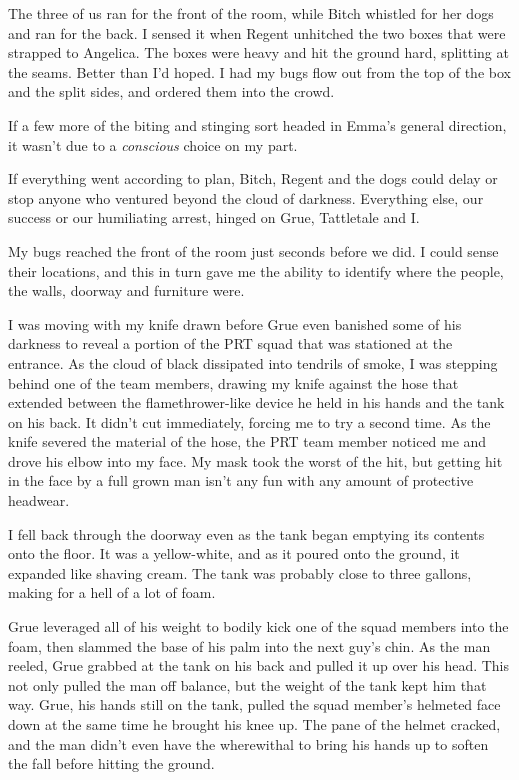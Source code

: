 The three of us ran for the front of the room, while Bitch whistled for her dogs and ran for the back.  I sensed it when Regent unhitched the two boxes that were strapped to Angelica.  The boxes were heavy and  hit the ground hard, splitting at the seams.  Better than I'd hoped.  I had my bugs flow out from the top of the box and the split sides, and ordered them into the crowd.



If a few more of the biting and stinging sort headed in Emma's general direction, it wasn't due to a \emph{conscious} choice on my part.



If everything went according to plan, Bitch, Regent and the dogs could delay or stop anyone who ventured beyond the cloud of darkness.  Everything else, our success or our humiliating arrest, hinged on Grue, Tattletale and I.



My bugs reached the front of the room just seconds before we did.  I could sense their locations, and this in turn gave me the ability to identify where the people, the walls, doorway and furniture were.



I was moving with my knife drawn before Grue even banished some of his darkness to reveal a portion of the PRT squad that was stationed at the entrance.  As the cloud of black dissipated into tendrils of smoke, I was stepping behind one of the team members, drawing my knife against the hose that extended between the flamethrower-like device he held in his hands and the tank on his back.  It didn't cut immediately, forcing me to try a second time.  As the knife severed the material of the hose, the PRT team member noticed me and drove his elbow into my face.  My mask took the worst of the hit, but getting hit in the face by a full grown man isn't any fun with any amount of protective headwear.



I fell back through the doorway even as the tank began emptying its contents onto the floor.  It was a yellow-white, and as it poured onto the ground, it expanded like shaving cream.  The tank was probably close to three gallons, making for a hell of a lot of foam.



Grue leveraged all of his weight to bodily kick one of the squad members into the foam, then slammed the base of his palm into the next guy's chin.  As the man reeled, Grue grabbed at the tank on his back and pulled it up over his head.  This not only pulled the man off balance, but the weight of the tank kept him that way.  Grue, his hands still on the tank, pulled the squad member's helmeted face down at the same time he brought his knee up.  The pane of the helmet cracked, and the man didn't even have the wherewithal to bring his hands up to soften the fall before hitting the ground.



